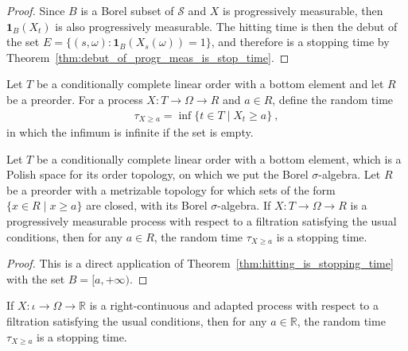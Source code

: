 \begin{proof}\leanok
Since $B$ is a Borel subset of $\mathcal{S}$ and $X$ is progressively measurable, then $\mathbf{1}_B(X_t)$ is also progressively measurable.
The hitting time is then the debut of the set $E = \{(s,\omega) : \mathbf{1}_B(X_s(\omega)) = 1\}$, and therefore is a stopping time by Theorem~\ref{thm:debut_of_progr_meas_is_stop_time}.
\end{proof}


\begin{definition}\label{def:leastGE}
  \mathlibok
Let $T$ be a conditionally complete linear order with a bottom element and let $R$ be a preorder.
For a process $X : T \to Ω \to R$ and $a \in R$, define the random time
\begin{align*}
  \tau_{X \ge a} = \inf\{t \in T \mid X_t \ge a\} \: ,
\end{align*}
in which the infimum is infinite if the set is empty.
\end{definition}


\begin{lemma}\label{lem:isStoppingTime_leastGE}
  \leanok
Let $T$ be a conditionally complete linear order with a bottom element, which is a Polish space for its order topology, on which we put the Borel $\sigma$-algebra.
Let $R$ be a preorder with a metrizable topology for which sets of the form $\{x \in R \mid x \ge a\}$ are closed, with its Borel $\sigma$-algebra.
If $X : T \to Ω \to R$ is a progressively measurable process with respect to a filtration satisfying the usual conditions, then for any $a \in R$, the random time $\tau_{X \ge a}$ is a stopping time.
\end{lemma}

\begin{proof}\leanok
This is a direct application of Theorem~\ref{thm:hitting_is_stopping_time} with the set $B = [a, +\infty)$.
\end{proof}


\begin{corollary}\label{cor:isStoppingTime_leastGE_of_rightContinuous}
If $X : ι \to Ω \to ℝ$ is a right-continuous and adapted process with respect to a filtration satisfying the usual conditions, then for any $a \in \mathbb{R}$, the random time $\tau_{X \ge a}$ is a stopping time.
\end{corollary}

